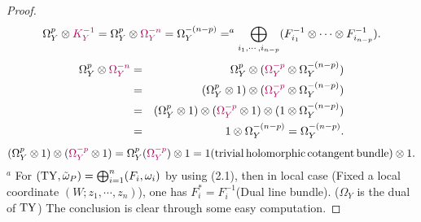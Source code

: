 \documentclass[twoside,openany,12pt]{beautynote}
\begin{document}
\begin{proof}
    \[ \Omega^p_Y \otimes {\color[HTML]{B4005A}K_Y^{- 1}} = \Omega^p_Y \otimes
        {\color[HTML]{B4005A}\Omega^{- n}_Y} = \Omega_Y^{- (n - p)} =^a
        \bigoplus_{i_1, \cdots, i_{n - p}} (F_{i_1}^{- 1} \otimes \cdots \otimes
        F_{i_{n - p}}^{- 1}) . \]
    \begin{eqnarray*}
        \Omega^p_Y \otimes {\color[HTML]{B4005A}\Omega^{- n}_Y} & = & \Omega^p_Y
        \otimes ({\color[HTML]{B4005A}\Omega^{- p}_Y} \otimes \Omega_Y^{- (n -
        p)})\\
        & = & (\Omega_Y^p \otimes 1) \otimes ({\color[HTML]{B4005A}\Omega^{-
        p}_Y} \otimes \Omega_Y^{- (n - p)})\\
        & = & (\Omega_Y^p \otimes 1) \otimes ({\color[HTML]{B4005A}\Omega^{-
        p}_Y} \otimes 1) \otimes (1 \otimes \Omega_Y^{- (n - p)})\\
        & = & 1 \otimes \Omega_Y^{- (n - p)} = \Omega_Y^{- (n - p)} .
    \end{eqnarray*}
    \[ (\Omega_Y^p \otimes 1) \otimes ({\color[HTML]{B4005A}\Omega^{- p}_Y}
    \otimes 1) = \Omega_Y^p ({\color[HTML]{B4005A}\Omega_Y^{- p}}) \otimes 1
    = 1 (\tmop{trivial} \tmop{holomorphic} \tmop{cotangent} \tmop{bundle})
    \otimes 1. \]
    $^a$ For $(\operatorname{TY}, \tilde{\omega}_P) = \bigoplus_{i = 1}^n (F_i,
    \omega_i)$ by using (2.1), then in local case (Fixed a local coordinate $(W
    ; z_1, \cdots, z_n)$), one has $F_i^{\ast} = F_i^{- 1}$(Dual line
    bundle)\cite[\S 2.2,p71]{huybrechts2005complex}. ($\Omega_Y$ is the dual
    of $\operatorname{TY}$) The conclusion is clear through some easy computation.
    

\end{proof}
\end{document}
